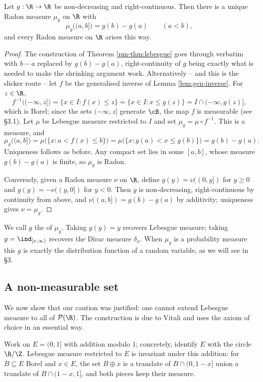 \begin{theorem}\label{thm:stieltjes}
	Let $g : \R \to \R$ be non-decreasing and right-continuous. Then there is a unique Radon measure $\mu_g$ on $\R$ with
	$$
	\mu_g\big((a,b]\big) = g(b) - g(a) \qquad (a<b),
	$$
	and every Radon measure on $\R$ arises this way.
\end{theorem}
\begin{proof}
	The construction of Theorem \ref{pm-thm:lebesgue} goes through verbatim with $b - a$ replaced by $g(b)-g(a)$, right-continuity of $g$ being exactly what is needed to make the shrinking argument work. Alternatively -- and this is the slicker route -- let $f$ be the generalised inverse of Lemma \ref{lem:gen-inverse}. For $z \in \R$,
	$$
	f^{-1}\big((-\infty, z]\big) = \{x \in I : f(x)\leq z\} = \{x \in I : x \leq g(z)\} = I \cap (-\infty, g(z)],
	$$
	which is Borel; since the sets $(-\infty,z]$ generate $\cB$, the map $f$ is measurable (see \S3.1). Let $\mu$ be Lebesgue measure restricted to $I$ and set $\mu_g = \mu \circ f^{-1}$. This is a measure, and
	$$
	\mu_g\big((a,b]\big) = \mu\big(\{x : a < f(x) \leq b\}\big) = \mu\big(\{x : g(a) < x \leq g(b)\}\big) = g(b)-g(a).
	$$
	Uniqueness follows as before. Any compact set lies in some $[a,b]$, whose measure $g(b)-g(a)$ is finite, so $\mu_g$ is Radon.

	Conversely, given a Radon measure $\nu$ on $\R$, define $g(y) = \nu((0,y])$ for $y \geq 0$ and $g(y) = -\nu((y,0])$ for $y<0$. Then $g$ is non-decreasing, right-continuous by continuity from above, and $\nu((a,b]) = g(b)-g(a)$ by additivity; uniqueness gives $\nu = \mu_g$.
\end{proof}

We call $g$ the  of $\mu_g$. Taking $g(y)=y$ recovers Lebesgue measure; taking $g = \ind_{[x,\infty)}$ recovers the Dirac measure $\delta_x$. When $\mu_g$ is a probability measure this $g$ is exactly the distribution function of a random variable, as we will see in \S3.

\subsection{A non-measurable set}

We now show that our caution was justified: one cannot extend Lebesgue measure to all of $\mathcal{P}(\R)$. The construction is due to Vitali and uses the axiom of choice in an essential way.

Work on $E = (0,1]$ with addition modulo $1$; concretely, identify $E$ with the circle $\R/\Z$. Lebesgue measure restricted to $E$ is invariant under this addition: for $B \subseteq E$ Borel and $x \in E$, the set $B \oplus x$ is a translate of $B \cap (0, 1-x]$ union a translate of $B \cap (1-x, 1]$, and both pieces keep their measure.

